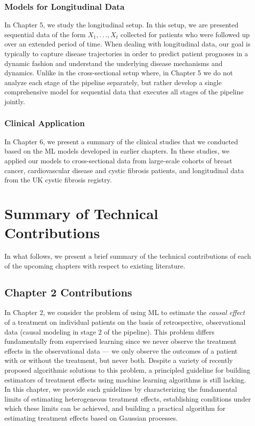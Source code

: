 \documentclass [PhD] {uclathes}
\begin{document}
\subsubsection{Models for Longitudinal Data}
In Chapter 5, we study the longitudinal setup. In this setup, we are presented sequential data of the form $X_1,.\,.\,.,X_t$ collected for patients who were followed up over an extended period of time. When dealing with longitudinal data, our goal is typically to capture disease trajectories in order to predict patient prognoses in a dynamic fashion and understand the underlying disease mechanisms and dynamics. Unlike in the cross-sectional setup where, in Chapter 5 we do not analyze each stage of the pipeline separately, but rather develop a single comprehensive model for sequential data that executes all stages of the pipeline jointly.     

\subsubsection{Clinical Application}
In Chapter 6, we present a summary of the clinical studies that we conducted based on the ML models developed in earlier chapters. In these studies, we applied our models to cross-sectional data from large-scale cohorts of breast cancer, cardiovascular disease and cystic fibrosis patients, and longitudinal data from the UK cystic fibrosis registry.

\section{Summary of Technical Contributions}
In what follows, we present a brief summary of the technical contributions of each of the upcoming chapters with respect to existing literature.

\label{Sec12}
\subsection*{Chapter 2 Contributions}
In Chapter 2, we consider the problem of using ML to estimate the \textit{causal effect} of a treatment on individual patients on the basis of retrospective, observational data (causal modeling in stage 2 of the pipeline). This problem differs fundamentally from supervised learning since we never observe the treatment effects in the observational data --- we only observe the outcomes of a patient with or without the treatment, but never both. Despite a variety of recently proposed algorithmic solutions to this problem, a principled guideline for building estimators of treatment effects using machine learning algorithms is still lacking. In this chapter, we provide such guidelines by characterizing the fundamental limits of estimating heterogeneous treatment effects, establishing conditions under which these limits can be achieved, and building a practical algorithm for estimating treatment effects based on Gaussian processes. 
\end{document}
